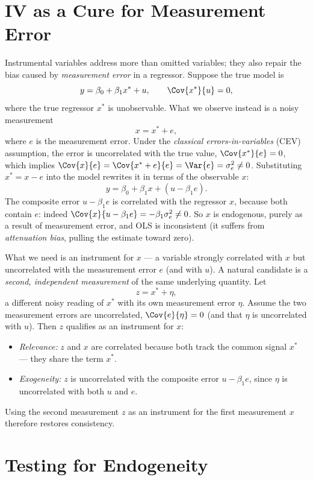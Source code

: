 \section{IV as a Cure for Measurement Error}
\label{sec:iv-measurement}

Instrumental variables address more than omitted variables; they also repair the bias caused by \emph{measurement error} in a regressor. Suppose the true model is
\[
y = \beta_0 + \beta_1 x^{*} + u,
\qquad \Cov{x^{*}}{u}=0,
\]
where the true regressor $x^{*}$ is unobservable. What we observe instead is a noisy measurement
\[
x = x^{*} + e,
\]
where $e$ is the measurement error. Under the \emph{classical errors-in-variables} (CEV) assumption, the error is uncorrelated with the true value, $\Cov{x^{*}}{e}=0$, which implies $\Cov{x}{e} = \Cov{x^{*}+e}{e} = \Var{e} = \sigma_e^2 \neq 0$. Substituting $x^{*}=x-e$ into the model rewrites it in terms of the observable $x$:
\[
y = \beta_0 + \beta_1 x + (u - \beta_1 e).
\]
The composite error $u-\beta_1 e$ is correlated with the regressor $x$, because both contain $e$: indeed $\Cov{x}{u-\beta_1 e} = -\beta_1\sigma_e^2 \neq 0$. So $x$ is endogenous, purely as a result of measurement error, and OLS is inconsistent (it suffers from \emph{attenuation bias}, pulling the estimate toward zero).

What we need is an instrument for $x$ --- a variable strongly correlated with $x$ but uncorrelated with the measurement error $e$ (and with $u$). A natural candidate is a \emph{second, independent measurement} of the same underlying quantity. Let
\[
z = x^{*} + \eta,
\]
a different noisy reading of $x^{*}$ with its own measurement error $\eta$. Assume the two measurement errors are uncorrelated, $\Cov{e}{\eta}=0$ (and that $\eta$ is uncorrelated with $u$). Then $z$ qualifies as an instrument for $x$:
\begin{itemize}
    \item \emph{Relevance:} $z$ and $x$ are correlated because both track the common signal $x^{*}$ --- they share the term $x^{*}$.
    \item \emph{Exogeneity:} $z$ is uncorrelated with the composite error $u-\beta_1 e$, since $\eta$ is uncorrelated with both $u$ and $e$.
\end{itemize}
Using the second measurement $z$ as an instrument for the first measurement $x$ therefore restores consistency.

\section{Testing for Endogeneity}
\label{sec:endog-test}

